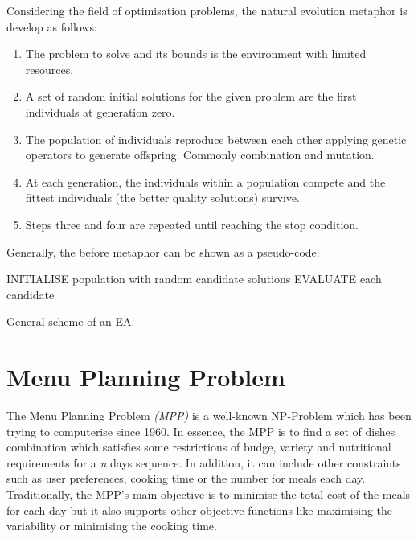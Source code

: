 Considering the field of optimisation problems, the natural evolution metaphor is develop as follows:
\begin{enumerate}
    \item The problem to solve and its bounds is the environment with limited resources.
    \item A set of random initial solutions for the given problem are the first individuals at generation zero. 
    \item The population of individuals reproduce between each other applying genetic operators to generate offspring. Commonly combination and mutation.
    \item At each generation, the individuals within a population compete and the fittest individuals (the better quality solutions) survive.
    \item Steps three and four are repeated until reaching the stop condition.
\end{enumerate}
Generally, the before metaphor can be shown as a pseudo-code\cite{eiben}:

\begin{algorithm}[!h]
  INITIALISE population with random candidate solutions\;
  EVALUATE each candidate\;
  \caption{General scheme of an EA.}
\end{algorithm}

\newpage
\section{Menu Planning Problem}

The Menu Planning Problem \textit{(MPP)} is a well-known NP-Problem which has been trying to computerise since 1960\cite{Ngo2016}. In essence, the MPP is to find a set of dishes combination which satisfies some restrictions of budge, variety and nutritional requirements for a \textit{n} days sequence. In addition, it can include other constraints such as user preferences, cooking time or the number for meals each day.
Traditionally, the MPP's main objective is to minimise the total cost of the meals for each day\cite{Ngo2016, Moreira2018} but it also supports other objective functions like maximising the variability or minimising the cooking time.

